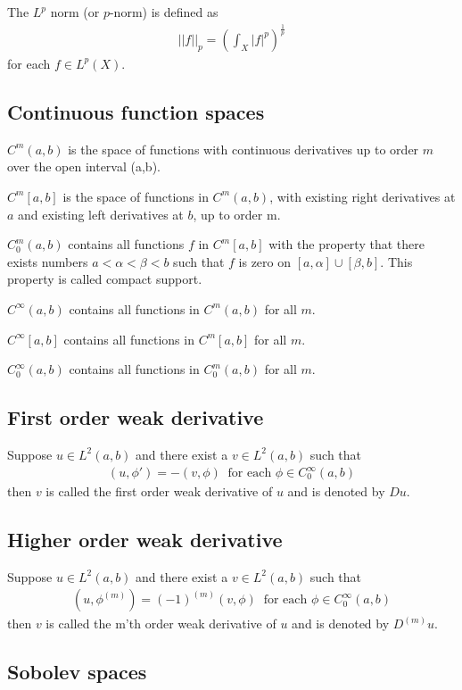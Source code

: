 \documentclass[main.tex]{subfiles}
\begin{document}
The \( L^p \) norm (or \( p \)-norm) is defined as
\begin{eqnarray*}
    ||f||_p = \left( \int_X |f|^p \right)^{\frac{1}{p}}
\end{eqnarray*}
for each \( f \in L^p(X) \).

\subsection*{Continuous function spaces}
$C^m(a,b)$ is the space of functions with continuous derivatives up to order $m$ over the open interval (a,b).

$C^m[a,b]$ is the space of functions in $C^m(a,b)$, with existing right derivatives at $a$ and existing left derivatives at $b$, up to order m.

$C_0^m(a,b)$ contains all functions $f$ in $C^m[a,b]$ with the property that there exists numbers $a < \alpha < \beta < b$ such that $f$ is zero on $[a,\alpha] \cup [\beta, b]$. This property is called compact support.

$C^\infty(a,b)$ contains all functions in $C^m(a,b)$ for all $m$.

$C^\infty[a,b]$ contains all functions in $C^m[a,b]$ for all $m$.

$C_0^\infty(a,b)$ contains all functions in $C_0^m(a,b)$ for all $m$.


\subsection*{First order weak derivative}
Suppose $u \in L^2(a,b)$ and there exist a $v \in L^2(a,b)$ such that
\begin{eqnarray*}
	(u,\phi') = -(v,\phi) \ \textrm{ for each } \phi \in C^{\infty}_0(a,b)
\end{eqnarray*}
then $v$ is called the first order weak derivative of $u$ and is denoted by $Du$.

\subsection*{Higher order weak derivative}
Suppose $u \in L^2(a,b)$ and there exist a $v \in L^2(a,b)$ such that
\begin{eqnarray*}
	(u,\phi^{(m)}) = (-1)^{(m)}(v,\phi) \ \textrm{ for each } \phi \in C^{\infty}_0(a,b)
\end{eqnarray*}
then $v$ is called the m'th order weak derivative of $u$ and is denoted by $D^{(m)}u$.

\subsection*{Sobolev spaces}
\end{document}
